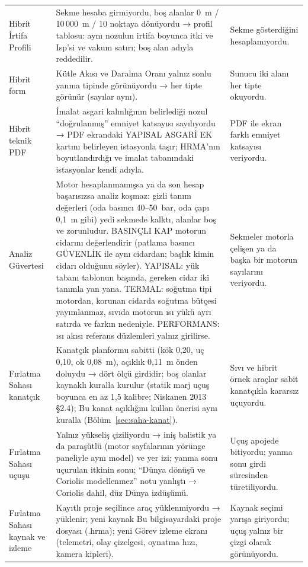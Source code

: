 \documentclass[11pt,a4paper]{article}
\newcommand{\ui}[1]{\textsf{#1}}
\begin{document}
\begin{longtable}{@{}>{\raggedright\arraybackslash}p{3.0cm}>{\raggedright\arraybackslash}p{8.0cm}>{\raggedright\arraybackslash}p{4.6cm}@{}}
Hibrit \ui{İrtifa Profili} & Sekme hesaba girmiyordu, boş alanlar 0~m / 10\,000~m / 10 noktaya dönüyordu → profil tablosu: aynı nozulun irtifa boyunca itki ve Isp'si ve vakum satırı; boş alan adıyla reddedilir. & Sekme gösterdiğini hesaplamıyordu. \\
Hibrit form & \ui{Kütle Akısı} ve \ui{Daralma Oranı} yalnız sonlu yanma tipinde görünüyordu → her tipte görünür (sayılar aynı). & Sunucu iki alanı her tipte okuyordu. \\
Hibrit teknik PDF & İmalat asgari kalınlığının belirlediği nozul ``doğrulanmış'' emniyet katsayısı sayılıyordu → PDF ekrandaki \ui{YAPISAL ASGARİ EK} kartını belirleyen istasyonla taşır; HRMA'nın boyutlandırdığı ve imalat tabanındaki istasyonlar kendi adıyla. & PDF ile ekran farklı emniyet katsayısı veriyordu. \\
Analiz Güvertesi & Motor hesaplanmamışsa ya da son hesap başarısızsa analiz koşmaz: gizli tanım değerleri (oda basıncı 40--50~bar, oda çapı 0,1~m gibi) yedi sekmede kalktı, alanlar boş ve zorunludur. \ui{BASINÇLI KAP} motorun cidarını değerlendirir (patlama basıncı \ui{GÜVENLİK} ile aynı cidardan; başlık kimin cidarı olduğunu söyler). \ui{YAPISAL}: yük tabanı tablonun başında, gereken cidar iki tanımla yan yana. \ui{TERMAL}: soğutma tipi motordan, korunan cidarda soğutma bütçesi yayımlanmaz, sıvıda motorun ısı yükü ayrı satırda ve farkın nedeniyle. \ui{PERFORMANS}: ısı akısı referans düzlemleri yalnız girilirse. & Sekmeler motorla çelişen ya da başka bir motorun sayılarını veriyordu. \\
Fırlatma Sahası kanatçık & Kanatçık planformu sabitti (kök 0,20, uç 0,10, ok 0,08~m), açıklık 0,11~m önden doluydu → dört ölçü girdidir; boş olanlar kaynaklı kuralla kurulur (statik marj uçuş boyunca en az 1,5 kalibre; Niskanen 2013 §2.4); \ui{Bu kanat açıklığını kullan} önerisi aynı kuralla (Bölüm~\ref{sec:saha-kanat}). & Sıvı ve hibrit örnek araçlar sabit kanatçıkla kararsız uçuyordu. \\
Fırlatma Sahası uçuşu & Yalnız yükseliş çiziliyordu → iniş balistik ya da paraşütlü (motor sayfalarının yörünge paneliyle aynı model) ve yer izi; yanma sonu uçurulan itkinin sonu; ``Dünya dönüşü ve Coriolis modellenmez'' notu yanlıştı → Coriolis dahil, düz Dünya izdüşümü. & Uçuş apojede bitiyordu; yanma sonu girdi süresinden türetiliyordu. \\
Fırlatma Sahası kaynak ve izleme & Kayıtlı proje seçilince araç yüklenmiyordu → yüklenir; yeni kaynak \ui{Bu bilgisayardaki proje dosyası (.hrma)}; yeni \ui{Görev izleme} ekranı (telemetri, olay çizelgesi, oynatma hızı, kamera kipleri). & Kaynak seçimi yarışa giriyordu; uçuş yalnız bir çizgi olarak görünüyordu. \\

\end{longtable}
\end{document}
